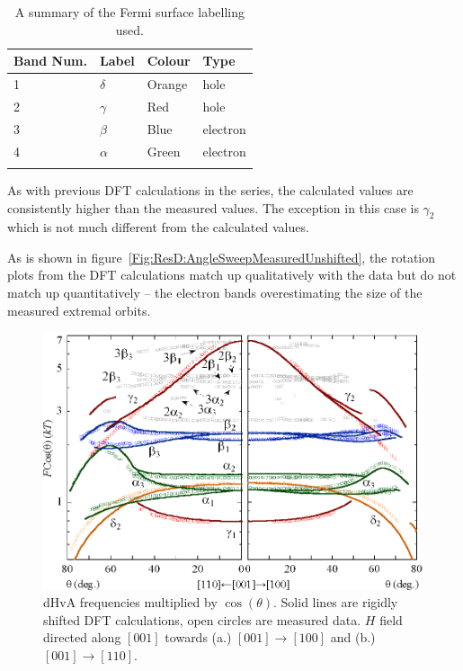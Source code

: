 \begin{table}
    \begin{center}
        \caption{A summary of the Fermi surface labelling used.}
        \begin{tabular}[htbp]{llll}
\toprule
Band Num.  & Label & Colour    & Type \\
\midrule
1   & $\delta$  & Orange    & hole \\
2   & $\gamma$  & Red   & hole \\
3   & $\beta$   & Blue  & electron \\
4   & $\alpha$  & Green & electron \\
\bottomrule
        \label{Tab:ResD:BandNaming}
        \end{tabular}
    \end{center}
\end{table}

As with previous \ac{DFT} calculations in the \BaFePAs series, the calculated values are consistently higher than the measured values\cite{Shishido2010}. The exception in this case is $\gamma_2$ which is not much different from the calculated values.

As is shown in figure~\ref{Fig:ResD:AngleSweepMeasuredUnshifted}, the rotation plots from the \ac{DFT} calculations match up qualitatively with the data but do not match up quantitatively -- the electron bands overestimating the size of the measured extremal orbits. 

\begin{figure}[htbp]
    \begin{center}
        \includegraphics[scale=0.9]{Chapter-dHvABaFe2P2/Figures/AngleDepMeasurements/AngleSweepRigidShift/AngleSweepRigidShift}
        \caption{\ac{dHvA} frequencies multiplied by $\cos(\theta)$. Solid lines are rigidly shifted \ac{DFT} calculations, open circles are measured data. $H$ field directed along $[001]$ towards (a.) $[001]\rightarrow[100]$ and (b.) $[001]\rightarrow[110]$.}
        \label{Fig:ResD:AngleSweepRigidShift}
    \end{center}
\end{figure}

